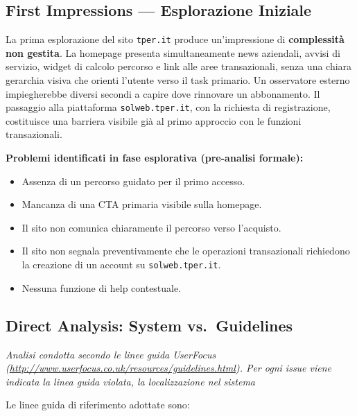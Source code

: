 \documentclass[11pt,a4paper]{article}
\begin{document}
\subsection*{First Impressions — Esplorazione Iniziale}

\noindent La prima esplorazione del sito \texttt{tper.it} produce
un'impressione di \textbf{complessità non gestita}. La homepage presenta
simultaneamente news aziendali, avvisi di servizio, widget di calcolo
percorso e link alle aree transazionali, senza una chiara gerarchia
visiva che orienti l'utente verso il task primario. Un osservatore
esterno impiegherebbe diversi secondi a capire dove rinnovare un
abbonamento. Il passaggio alla piattaforma \texttt{solweb.tper.it},
con la richiesta di registrazione, costituisce una barriera visibile
già al primo approccio con le funzioni transazionali.

\noindent\textbf{Problemi identificati in fase esplorativa (pre-analisi formale):}

\begin{itemize}
    \item Assenza di un percorso guidato per il primo accesso.
    \item Mancanza di una CTA primaria visibile sulla homepage.
    \item Il sito non comunica chiaramente il percorso verso l’acquisto.
    \item Il sito non segnala preventivamente che le operazioni
    transazionali richiedono la creazione di un account su
    \texttt{solweb.tper.it}.
    \item Nessuna funzione di help contestuale.
\end{itemize}

\subsection*{Direct Analysis: System vs.\ Guidelines}

\noindent\textit{Analisi condotta secondo le linee guida UserFocus (\url{http://www.userfocus.co.uk/resources/guidelines.html}). Per ogni issue viene indicata la linea guida violata, la localizzazione nel sistema}

\bigskip

\noindent Le linee guida di riferimento adottate sono:
\end{document}
